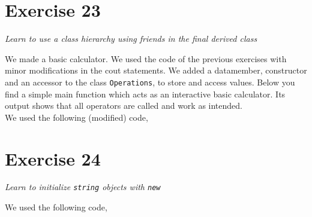 \documentclass[12pt]{article}
\newcommand{\desc}[1]{\textit{#1} \vspace{1em}}
\begin{document}


\clearpage

\section*{Exercise 23}
\desc{Learn to use a class hierarchy using friends in the final derived class}

We made a basic calculator. We used the code of the previous exercises with minor modifications in the cout statements. We added a datamember, constructor and an accessor to the class \texttt{Operations}, to store and access values. Below you find a simple main function which acts as an interactive basic calculator. Its output shows that all operators are called and work as intended.\\

We used the following (modified) code,




\clearpage

\section*{Exercise 24}
\desc{Learn to initialize \texttt{string} objects with \texttt{new}}

We used the following code,







\clearpage
\end{document}
